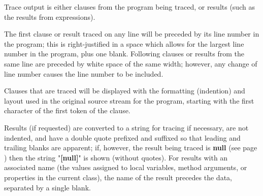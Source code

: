 Trace output is either clauses from the program being traced, or results
(such as the results from expressions).
 
The first clause or result traced on any line will be preceded by its
line number in the program; this is right-justified in a space which
allows for the largest line number in the program, plus one blank.
Following clauses or results from the same line are preceded by white
space of the same width; however, any change of line number causes the
line number to be included.
 
Clauses that are traced will be displayed with the formatting
(indention) and layout used in the original source stream for the
program, starting with the first character of the first token of the
clause.
 
Results (if requested) are converted to a string for tracing if
necessary, are not indented, and have a double quote prefixed and
suffixed so that leading and trailing blanks are apparent; if, however,
the result being traced is  \textbf{null} (see page \pageref{refswnull})  then the
string "\textbf{[null]}" is shown (without quotes).
For results with an associated name (the values assigned to local
variables, method arguments, or properties in the current class), the
name of the result precedes the data, separated by a single blank.
 
